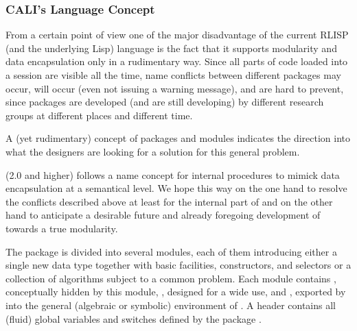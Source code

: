 \begin{center}
\end{center}

\subsubsection{CALI's Language Concept}

From a certain point of view one of the major disadvantage of the
current RLISP (and the underlying Lisp) language is the fact
that it supports modularity and data encapsulation only in a
rudimentary way.  Since all parts of code loaded into a session are
visible all the time, name conflicts between different packages may
occur, will occur (even not issuing a warning message), and are hard
to prevent, since packages are developed (and are still developing)
by different research groups at different places and different time.

A (yet rudimentary) concept of \REDUCE packages and modules indicates the
direction into what the \REDUCE designers are looking for a solution
for this general problem.
\medskip

 (2.0 and higher) follows a name concept for internal procedures
to mimick data encapsulation at a semantical level. We hope this way
on the one hand to resolve the conflicts described above at least for
the internal part of  and on the other hand to anticipate a
desirable future and already foregoing development of \REDUCE towards
a true modularity.

The package  is divided into several modules, each of them
introducing either a single new data type together with basic
facilities, constructors, and selectors or a collection of algorithms
subject to a common problem. Each module contains , conceptually hidden by this module, , designed for a  wide use, and , exported by  into the general (algebraic or
symbolic) environment of \REDUCE. A header  contains
all (fluid) global variables and switches defined by the package
.

